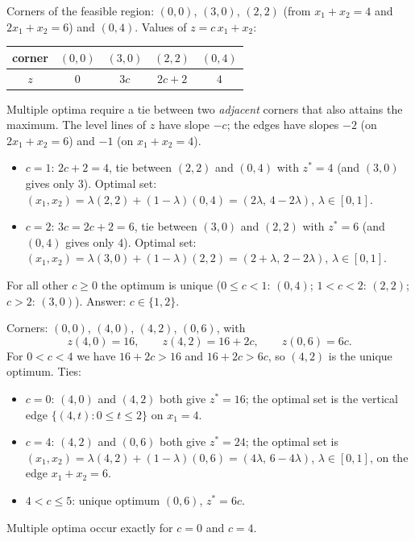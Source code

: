 \begin{solutions}
  \item Corners of the feasible region: $(0,0)$, $(3,0)$, $(2,2)$ (from
        $x_1+x_2=4$ and $2x_1+x_2=6$) and $(0,4)$. Values of
        $z=c\,x_1+x_2$:
        \begin{center}
        \begin{tabular}{c|cccc}
        \hline
        corner & $(0,0)$ & $(3,0)$ & $(2,2)$ & $(0,4)$\\
        \hline
        $z$ & $0$ & $3c$ & $2c+2$ & $4$\\
        \hline
        \end{tabular}
        \end{center}
        Multiple optima require a tie between two \emph{adjacent} corners
        that also attains the maximum. The level lines of $z$ have slope
        $-c$; the edges have slopes $-2$ (on $2x_1+x_2=6$) and $-1$ (on
        $x_1+x_2=4$).
        \begin{itemize}[leftmargin=1.6em,itemsep=0.3ex]
          \item $c=1$: $2c+2=4$, tie between $(2,2)$ and $(0,4)$ with
                $z^{*}=4$ (and $(3,0)$ gives only $3$). Optimal set:
                $(x_1,x_2)=\lambda(2,2)+(1-\lambda)(0,4)
                =(2\lambda,\,4-2\lambda)$, $\lambda\in[0,1]$.
          \item $c=2$: $3c=2c+2=6$, tie between $(3,0)$ and $(2,2)$ with
                $z^{*}=6$ (and $(0,4)$ gives only $4$). Optimal set:
                $(x_1,x_2)=\lambda(3,0)+(1-\lambda)(2,2)
                =(2+\lambda,\,2-2\lambda)$, $\lambda\in[0,1]$.
        \end{itemize}
        For all other $c\ge 0$ the optimum is unique ($0\le c<1$:
        $(0,4)$; $1<c<2$: $(2,2)$; $c>2$: $(3,0)$). Answer:
        $c\in\{1,2\}$.

  \item Corners: $(0,0)$, $(4,0)$, $(4,2)$, $(0,6)$, with
        \[
          z(4,0)=16,\qquad z(4,2)=16+2c,\qquad z(0,6)=6c .
        \]
        For $0<c<4$ we have $16+2c>16$ and $16+2c>6c$, so $(4,2)$ is the
        unique optimum. Ties:
        \begin{itemize}[leftmargin=1.6em,itemsep=0.3ex]
          \item $c=0$: $(4,0)$ and $(4,2)$ both give $z^{*}=16$; the
                optimal set is the vertical edge
                $\{(4,t):0\le t\le 2\}$ on $x_1=4$.
          \item $c=4$: $(4,2)$ and $(0,6)$ both give $z^{*}=24$; the
                optimal set is
                $(x_1,x_2)=\lambda(4,2)+(1-\lambda)(0,6)
                =(4\lambda,\,6-4\lambda)$, $\lambda\in[0,1]$, on the edge
                $x_1+x_2=6$.
          \item $4<c\le 5$: unique optimum $(0,6)$, $z^{*}=6c$.
        \end{itemize}
        Multiple optima occur exactly for $c=0$ and $c=4$.


\end{solutions}
